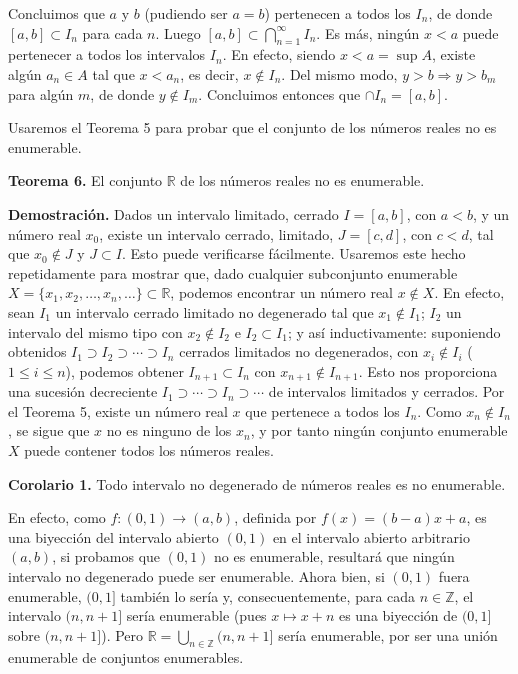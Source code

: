 \documentclass[12pt,oneside]{book}
\begin{document}
Concluimos que \(a\) y \(b\) (pudiendo ser \(a = b\)) pertenecen a todos los \(I_n\), de donde \([a, b] \subset I_n\) para cada \(n\). Luego \([a, b] \subset \bigcap_{n=1}^\infty I_n\). Es más, ningún \(x < a\) puede pertenecer a todos los intervalos \(I_n\). En efecto, siendo \(x < a = \sup A\), existe algún \(a_n \in A\) tal que \(x < a_n\), es decir, \(x \notin I_n\). Del mismo modo, \(y > b \Rightarrow y > b_m\) para algún \(m\), de donde \(y \notin I_m\). Concluimos entonces que \(\cap I_n = [a, b]\).

Usaremos el Teorema 5 para probar que el conjunto de los números reales no es enumerable.

\textbf{Teorema 6.} El conjunto \(\mathbb{R}\) de los números reales no es enumerable.

\textbf{Demostración.} Dados un intervalo limitado, cerrado \(I = [a, b]\), con \(a < b\), y un número real \(x_0\), existe un intervalo cerrado, limitado, \(J = [c, d]\), con \(c < d\), tal que \(x_0 \notin J\) y \(J \subset I\). Esto puede verificarse fácilmente. Usaremos este hecho repetidamente para mostrar que, dado cualquier subconjunto enumerable \(X = \{x_1, x_2, \ldots, x_n, \ldots\} \subset \mathbb{R}\), podemos encontrar un número real \(x \notin X\). En efecto, sean \(I_1\) un intervalo cerrado limitado no degenerado tal que \(x_1 \notin I_1\); \(I_2\) un intervalo del mismo tipo con \(x_2 \notin I_2\) e \(I_2 \subset I_1\); y así inductivamente: suponiendo obtenidos \(I_1 \supset I_2 \supset \cdots \supset I_n\) cerrados limitados no degenerados, con \(x_i \notin I_i\) (\(1 \leq i \leq n\)), podemos obtener \(I_{n+1} \subset I_n\) con \(x_{n+1} \notin I_{n+1}\). Esto nos proporciona una sucesión decreciente \(I_1 \supset \cdots \supset I_n \supset \cdots\) de intervalos limitados y cerrados. Por el Teorema 5, existe un número real \(x\) que pertenece a todos los \(I_n\). Como \(x_n \notin I_n\), se sigue que \(x\) no es ninguno de los \(x_n\), y por tanto ningún conjunto enumerable \(X\) puede contener todos los números reales.

\textbf{Corolario 1.} Todo intervalo no degenerado de números reales es no enumerable.

En efecto, como \( f: (0,1) \to (a,b) \), definida por \( f(x) = (b - a)x + a \), es una biyección del intervalo abierto \( (0,1) \) en el intervalo abierto arbitrario \( (a,b) \), si probamos que \( (0,1) \) no es enumerable, resultará que ningún intervalo no degenerado puede ser enumerable. Ahora bien, si \( (0,1) \) fuera enumerable, \( (0,1] \) también lo sería y, consecuentemente, para cada \( n \in \mathbb{Z} \), el intervalo \( (n, n+1] \) sería enumerable (pues \( x \mapsto x+n \) es una biyección de \( (0,1] \) sobre \( (n, n+1] \)). Pero \( \mathbb{R} = \bigcup_{n \in \mathbb{Z}} (n, n+1] \) sería enumerable, por ser una unión enumerable de conjuntos enumerables.
\end{document}
